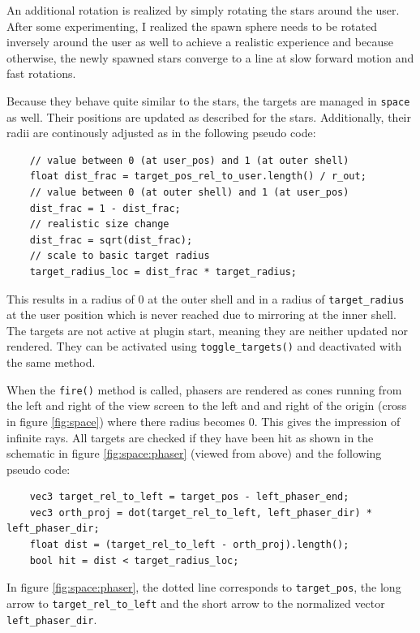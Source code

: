 \documentclass[hyperref, bachelorofscience]{cgvpub}
\begin{document}
An additional rotation is realized by simply rotating the stars around the user. After some experimenting, I realized the spawn sphere needs to be rotated inversely around the user as well to achieve a realistic experience and because otherwise, the newly spawned stars converge to a line at slow forward motion and fast rotations.

Because they behave quite similar to the stars, the targets are managed in \lstinline|space| as well. Their positions are updated as described for the stars. Additionally, their radii are continously adjusted as in the following pseudo code:

\begin{lstlisting}
	// value between 0 (at user_pos) and 1 (at outer shell)
	float dist_frac = target_pos_rel_to_user.length() / r_out;
	// value between 0 (at outer shell) and 1 (at user_pos)
	dist_frac = 1 - dist_frac;
	// realistic size change
	dist_frac = sqrt(dist_frac);
	// scale to basic target radius
	target_radius_loc = dist_frac * target_radius;
\end{lstlisting}

This results in a radius of $ 0 $ at the outer shell and in a radius of \lstinline|target_radius| at the user position which is never reached due to mirroring at the inner shell. The targets are not active at plugin start, meaning they are neither updated nor rendered. They can be activated using \lstinline|toggle_targets()| and deactivated with the same method.

When the \lstinline|fire()| method is called, phasers are rendered as cones running from the left and right of the view screen to the left and and right of the origin (cross in figure \ref{fig:space}) where there radius becomes $ 0 $. This gives the impression of infinite rays. All targets are checked if they have been hit as shown in the schematic in figure \ref{fig:space:phaser} (viewed from above) and the following pseudo code:

\begin{lstlisting}
	vec3 target_rel_to_left = target_pos - left_phaser_end;
	vec3 orth_proj = dot(target_rel_to_left, left_phaser_dir) * left_phaser_dir;
	float dist = (target_rel_to_left - orth_proj).length();
	bool hit = dist < target_radius_loc;
\end{lstlisting}

In figure \ref{fig:space:phaser}, the dotted line corresponds to \lstinline|target_pos|, the long arrow to \lstinline|target_rel_to_left| and the short arrow to the normalized vector \lstinline|left_phaser_dir|. 
\end{document}
